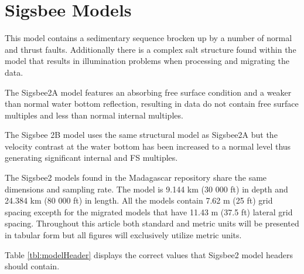 {
\tiny

\normalsize
}

\section{Sigsbee Models}
This model contains a sedimentary sequence brocken up by a number of normal and thrust faults.  Additionally there is a complex 
salt structure found within the model that results in illumination problems when processing and migrating the data.   

The Sigsbee2A model features an absorbing free surface condition and a weaker than normal water bottom reflection, 
resulting in data do not contain free surface multiples and less than normal internal multiples.  

The Sigsbee 2B model uses the same structural model as Sigsbee2A but the velocity contrast at the water bottom has been 
increased to a normal level thus generating significant internal and FS multiples. 

The Sigsbee2 models found in the Madagascar repository share the same dimensions and sampling rate.  The model is 9.144 km (30 000 ft) in 
depth and 24.384 km (80 000 ft) in length.  All the models contain 7.62 m (25 ft) grid spacing excepth for the migrated models that have
11.43 m (37.5 ft) lateral grid spacing.  Throughout this article both standard and metric units will be presented in tabular form but all
figures will exclusively utilize metric units.   

Table \ref{tbl:modelHeader} displays the correct values that Sigsbee2 model headers should contain. 

